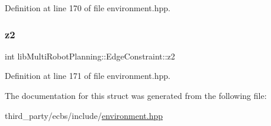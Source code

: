 Definition at line 170 of file environment.\+hpp.

\mbox{\label{structlib_multi_robot_planning_1_1_edge_constraint_aff60d0e728647f8d80dcd6925f0e3f58}} 
\subsubsection{\texorpdfstring{z2}{z2}}
{\footnotesize\ttfamily int lib\+Multi\+Robot\+Planning\+::\+Edge\+Constraint\+::z2}



Definition at line 171 of file environment.\+hpp.



The documentation for this struct was generated from the following file\+:\begin{DoxyCompactItemize}
\item 
third\+\_\+party/ecbs/include/\hyperlink{environment_8hpp}{environment.\+hpp}\end{DoxyCompactItemize}
